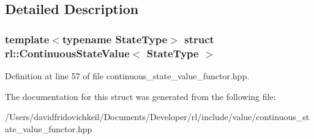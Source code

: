 \subsection{Detailed Description}
\subsubsection*{template$<$typename State\+Type$>$\newline
struct rl\+::\+Continuous\+State\+Value$<$ State\+Type $>$}



Definition at line 57 of file continuous\+\_\+state\+\_\+value\+\_\+functor.\+hpp.



The documentation for this struct was generated from the following file\+:\begin{DoxyCompactItemize}
\item 
/\+Users/davidfridovichkeil/\+Documents/\+Developer/rl/include/value/continuous\+\_\+state\+\_\+value\+\_\+functor.\+hpp\end{DoxyCompactItemize}

